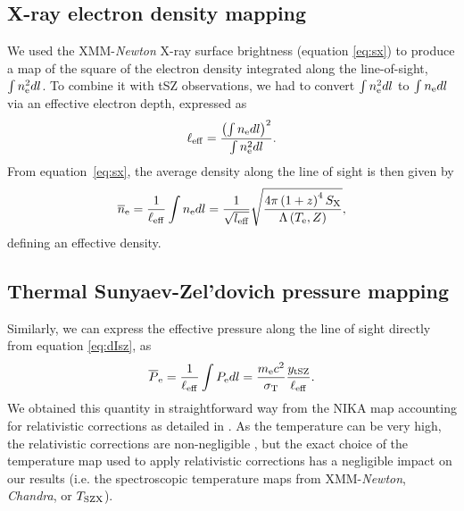 \documentclass[twocolumn,traditabstract]{aa}
\def\TSZ {T_{\rm SZX}}
\begin{document}
\subsection{X-ray electron density mapping}
We used the XMM-\textit{Newton} X-ray surface brightness (equation \ref{eq:sx}) to produce a map of the square of the electron density integrated along the line-of-sight, $\int n_{\rm e}^2 dl$. To combine it with tSZ observations, we had to convert $\int n_{\rm e}^2 dl$ to $\int n_{\rm e} dl$ via an effective electron depth, expressed as
\begin{equation}
        \ell_{\rm eff} = \frac{\left(\int n_{\rm e} dl\right)^2}{\int n_{\rm e}^2 dl}.
\label{eq:l_eff}
\end{equation}
From equation~\ref{eq:sx}, the average density along the line of sight is then given by
\begin{equation}
        \overline{n}_{\rm e} = \frac{1}{\ell_{\rm eff}} \int n_{\rm e} dl = \frac{1}{\sqrt{l_{\rm eff}}}\sqrt{\frac{4 \pi \left(1+z\right)^4 S_{\rm X}}{\Lambda\left(T_{\rm e}, Z\right)}},
\end{equation}
defining an effective density.

\subsection{Thermal Sunyaev-Zel'dovich pressure mapping}
Similarly, we can express the effective pressure along the line of sight directly from equation \ref{eq:dIsz}, as
\begin{equation}
        \overline{P}_{\rm e} = \frac{1}{\ell_{\rm eff}} \int P_{\rm e} dl = \frac{m_{\rm e} c^2}{\sigma_{\rm T}} \frac{y_{\rm tSZ}}{\ell_{\rm eff}}.
\label{eq:pseudo_p}
\end{equation}
We obtained this quantity in straightforward way from the NIKA map accounting for relativistic corrections as detailed in \cite{Adam2016b}. As the temperature can be very high, the relativistic corrections are non-negligible \citep{Pointecouteau1998,Itoh2003}, but the exact choice of the temperature map used to apply relativistic corrections has a negligible impact on our results (i.e. the spectroscopic temperature maps from XMM-\textit{Newton}, \textit{Chandra}, or $\TSZ$).

\end{document}
